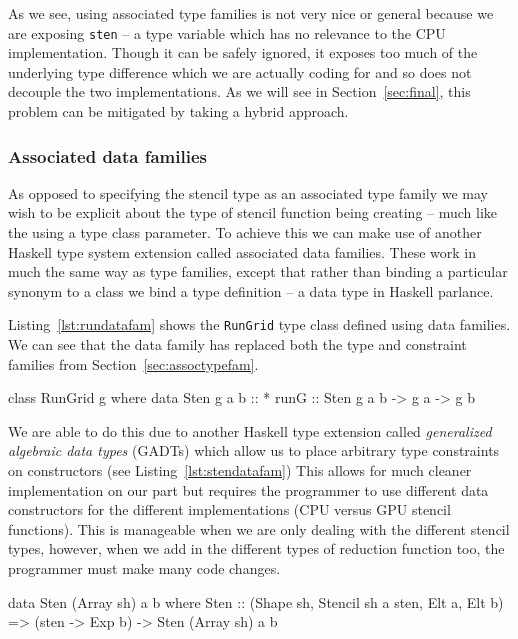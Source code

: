 \documentclass[12pt,a4paper,twoside]{scrbook}
\begin{document}
As we see, using associated type families is not very nice or general because we
are exposing \texttt{sten} -- a type variable which has no relevance to the CPU
implementation. Though it can be safely ignored, it exposes too much of the
underlying type difference which we are actually coding for and so does not
decouple the two implementations. As we will see in Section~\ref{sec:final},
this problem can be mitigated by taking a hybrid approach.

\subsubsection{Associated data families}

As opposed to specifying the stencil type as an associated type family we may
wish to be explicit about the type of stencil function being creating -- much
like the using a type class parameter. To achieve this we can make use of
another Haskell type system extension called associated data families. These
work in much the same way as type families, except that rather than binding a
particular synonym to a class we bind a type definition -- a data type in
Haskell parlance.

Listing~\ref{lst:rundatafam} shows the \texttt{RunGrid} type class defined using
data families. We can see that the data family has replaced both the type and
constraint families from Section~\ref{sec:assoctypefam}.

\begin{hflisting}[label=lst:rundatafam,
caption=RunGrid with associated data family.]
class RunGrid g where
    data Sten g a b :: *
    runG :: Sten g a b -> g a -> g b
\end{hflisting}

We are able to do this due to another Haskell type extension called
\emph{generalized algebraic data types} (GADTs) which allow us to place
arbitrary type constraints on constructors (see Listing~\ref{lst:stendatafam})
This allows for much cleaner implementation on our part but requires the
programmer to use different data constructors for the different implementations
(CPU versus GPU stencil functions). This is manageable when we are only dealing
with the different stencil types, however, when we add in the different types of
reduction function too, the programmer must make many code changes.

\begin{hflisting}[label=lst:stendatafam,
caption=An example of a stencil data type for the GPU]
data Sten (Array sh) a b where
        Sten :: (Shape sh, Stencil sh a sten,
                 Elt a, Elt b) =>
                (sten -> Exp b)
                -> Sten (Array sh) a b
\end{hflisting}
\end{document}
